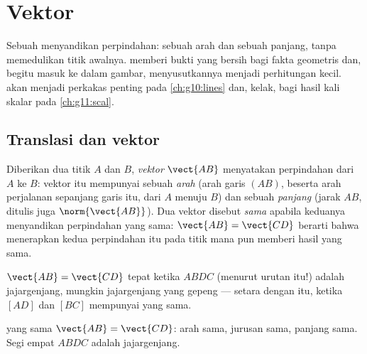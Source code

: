 \chapter{Vektor}\label{ch:g10:vectors}

Sebuah  menyandikan perpindahan: sebuah arah dan sebuah panjang,
tanpa memedulikan titik awalnya.  memberi bukti yang bersih bagi
fakta geometris dan, begitu  masuk ke dalam gambar, menyusutkannya
menjadi perhitungan kecil.  akan menjadi perkakas penting pada
\cref{ch:g10:lines} dan, kelak, bagi hasil kali skalar pada \cref{ch:g11:scal}.

\section{Translasi dan vektor}

\begin{definition}[Vektor]\label{def:g10:vectors:vector}
Diberikan dua titik $A$ dan $B$, \emph{vektor} $\vect{AB}$
menyatakan perpindahan dari $A$ ke $B$: vektor itu mempunyai sebuah
\emph{arah} (arah garis $(AB)$, beserta arah perjalanan sepanjang
garis itu, dari $A$ menuju $B$) dan sebuah
\emph{panjang} (jarak $AB$, ditulis juga $\norm{\vect{AB}}$).
Dua vektor disebut \emph{sama} apabila keduanya menyandikan perpindahan yang
sama: $\vect{AB} = \vect{CD}$ berarti bahwa menerapkan kedua perpindahan itu
pada titik mana pun memberi hasil yang sama.
\end{definition}

\begin{proposition}\label{prop:g10:vectors:parallelogram}
$\vect{AB} = \vect{CD}$ tepat ketika $ABDC$ (menurut urutan itu!) adalah
jajargenjang, mungkin jajargenjang yang gepeng --- setara dengan itu, ketika
$[AD]$ dan $[BC]$ mempunyai  yang sama.
\end{proposition}
\admitted

\begin{omfigure}

{\small {} yang sama $\vect{AB} = \vect{CD}$: arah sama, jurusan sama,
panjang sama. Segi empat $ABDC$ adalah jajargenjang.}
\end{omfigure}

